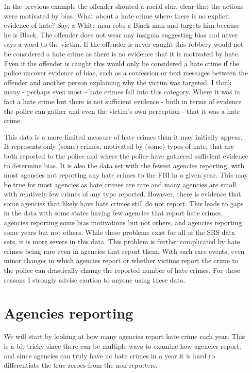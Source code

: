 \documentclass[
]{krantz}
\begin{document}
In the previous example the offender shouted a racial slur,
clear that the actions were motivated by bias. What about a
hate crime where there is no explicit evidence of hate? Say,
a White man robs a Black man and targets him because he is
Black. The offender does not wear any insignia suggesting
bias and never says a word to the victim. If the offender is
never caught this robbery would not be considered a hate
crime as there is no evidence that it is motivated by hate.
Even if the offender is caught this would only be considered
a hate crime if the police uncover evidence of bias, such as
a confession or text messages between the offender and
another person explaining why the victim was targeted. I
think many - perhaps even most - hate crimes fall into this
category. Where it was in fact a hate crime but there is not
sufficient evidence - both in terms of evidence the police
can gather and even the victim's own perception - that it
was a hate crime.

This data is a more limited measure of hate crimes than it
may initially appear. It represents only (some) crimes,
motivated by (some) types of hate, that are both reported to
the police and where the police have gathered sufficient
evidence to determine bias. It is also the data set with the
fewest agencies reporting, with most agencies not reporting
any hate crimes to the FBI in a given year. This may be true
for most agencies as hate crimes are rare and many agencies
are small with relatively few crimes of any type reported.
However, there is evidence that some agencies that likely
have hate crimes still do not report. This leads to gaps in
the data with some states having few agencies that report
hate crimes, agencies reporting some bias motivations but
not others, and agencies reporting some years but not
others. While these problems exist for all of the SRS
data sets, it is more severe in this data. This problem is
further complicated by hate crimes being rare even in
agencies that report them. With such rare events, even minor
changes in which agencies report or whether victims report
the crime to the police can drastically change the reported
number of hate crimes. For these reasons I strongly advise
caution to anyone using these data.

\section{Agencies reporting}\label{agencies-reporting-5}

We will start by looking at how many agencies report hate
crime each year. This is a bit tricky since there can be
multiple ways to examine how agencies report, and since
agencies can truly have no hate crimes in a year it is hard
to differentiate the true zeroes from the non-reporters.
\end{document}
